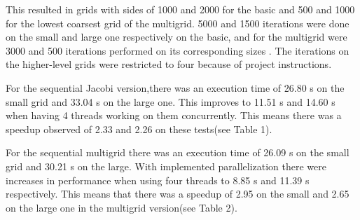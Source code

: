 \documentclass{article}
\begin{document}
This resulted in grids with sides of 1000 and 2000 for the basic and 500 and 1000 for the lowest coarsest grid of the multigrid. 5000 and 1500 iterations were done on the small and large one respectively on the basic, and for the multigrid were 3000 and 500 iterations performed on its corresponding sizes . The iterations on the higher-level grids were restricted to four because of project instructions.


For the sequential Jacobi version,there was an execution time of 26.80 s on the small grid and 33.04 s on the large one. This improves to 11.51 s and 14.60 s when having 4 threads working on them concurrently. This means there was a speedup observed of 2.33 and 2.26 on these tests(see Table 1).

For the sequential multigrid there was an execution time of 26.09 s on the small grid and 30.21 s on the large. With implemented parallelization there were increases in performance when using four threads to 8.85 s and 11.39 s respectively. This means that there was a speedup of 2.95 on the small and 2.65 on the large one in the multigrid version(see Table 2).

\begin{table}
\centering
{}
\caption{Sequential Multigrid test results}
\label{fig:multigrid}
\end{table}
\end{document}
